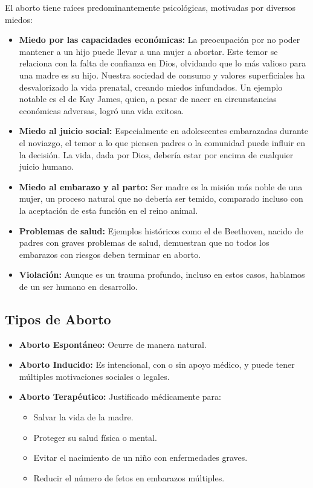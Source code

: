 \documentclass[
  jou,
  floatsintext,
  longtable,
  a4paper,
  nolmodern,
  notxfonts,
  notimes,
  colorlinks=true,linkcolor=blue,citecolor=blue,urlcolor=blue]{apa7}
\providecommand{\tightlist}{%
  \setlength{\itemsep}{0pt}\setlength{\parskip}{0pt}}
\begin{document}
El aborto tiene raíces predominantemente psicológicas, motivadas por
diversos miedos:

\begin{itemize}
\item
  \textbf{Miedo por las capacidades económicas:} La preocupación por no
  poder mantener a un hijo puede llevar a una mujer a abortar. Este
  temor se relaciona con la falta de confianza en Dios, olvidando que lo
  más valioso para una madre es su hijo. Nuestra sociedad de consumo y
  valores superficiales ha desvalorizado la vida prenatal, creando
  miedos infundados. Un ejemplo notable es el de Kay James, quien, a
  pesar de nacer en circunstancias económicas adversas, logró una vida
  exitosa.
\item
  \textbf{Miedo al juicio social:} Especialmente en adolescentes
  embarazadas durante el noviazgo, el temor a lo que piensen padres o la
  comunidad puede influir en la decisión. La vida, dada por Dios,
  debería estar por encima de cualquier juicio humano.
\item
  \textbf{Miedo al embarazo y al parto:} Ser madre es la misión más
  noble de una mujer, un proceso natural que no debería ser temido,
  comparado incluso con la aceptación de esta función en el reino
  animal.
\item
  \textbf{Problemas de salud:} Ejemplos históricos como el de Beethoven,
  nacido de padres con graves problemas de salud, demuestran que no
  todos los embarazos con riesgos deben terminar en aborto.
\item
  \textbf{Violación:} Aunque es un trauma profundo, incluso en estos
  casos, hablamos de un ser humano en desarrollo.
\end{itemize}

\subsection{Tipos de Aborto}\label{tipos-de-aborto}

\begin{itemize}
\item
  \textbf{Aborto Espontáneo:} Ocurre de manera natural.
\item
  \textbf{Aborto Inducido:} Es intencional, con o sin apoyo médico, y
  puede tener múltiples motivaciones sociales o legales.
\item
  \textbf{Aborto Terapéutico:} Justificado médicamente para:

  \begin{itemize}
  \tightlist
  \item
    Salvar la vida de la madre.
  \item
    Proteger su salud física o mental.
  \item
    Evitar el nacimiento de un niño con enfermedades graves.
  \item
    Reducir el número de fetos en embarazos múltiples.
  \end{itemize}
\end{itemize}
\end{document}

